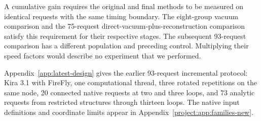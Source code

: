 A cumulative gain requires the original and final methods to be measured on identical requests with the same timing boundary. The eight-group vacuum comparison and the 75-request direct-vacuum-plus-reconstruction comparison satisfy this requirement for their respective stages. The subsequent 93-request comparison has a different population and preceding control. Multiplying their speed factors would describe no experiment that we performed.

Appendix~\ref{app:latest-design} gives the earlier 93-request incremental protocol: Kira 3.1 with FireFly, one computational thread, three rotated repetitions on the same node, 20 connected native requests at two and three loops, and 73 analytic requests from restricted structures through thirteen loops. The native input definitions and coordinate limits appear in Appendix~\ref{project:app:families-new}.
